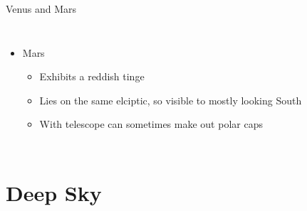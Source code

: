 \documentclass[pdf, aspectratio=169]{beamer}
\begin{document}
\begin{frame}{Venus and Mars}
\begin{columns}
\begin{itemize}
\begin{itemize}
						\begin{itemize}
							\item Currently so close to the Sun as to be invisible
						\end{itemize}
					\item Goes through visible phases and size changes
				\end{itemize}
			\item<2-> Mars
				\begin{itemize}
					\item Exhibits a reddish tinge
					\item Lies on the same elciptic, so visible to mostly looking South
					\item With telescope can sometimes make out polar caps
				\end{itemize}
		\end{itemize}
	\end{columns}
\end{frame}

\section{Deep Sky}
\end{document}
